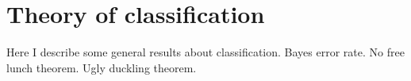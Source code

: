 \chapter{Theory of classification}
Here I describe some general results about classification. Bayes error rate. No free lunch theorem. Ugly duckling theorem.
